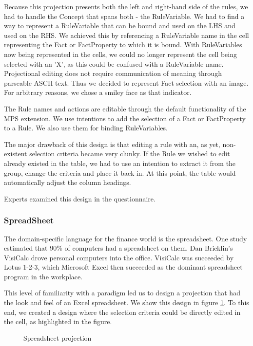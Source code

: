 Because this projection presents both the left and right-hand side of the rules, we had to handle the Concept that spans both - the RuleVariable.
We had to find a way to represent a RuleVariable that can be bound and used on the LHS and used on the RHS.
We achieved this by referencing a RuleVariable name in the cell representing the Fact or FactProperty to which it is bound.
With RuleVariables now being represented in the cells, we could no longer represent the cell being selected with an 'X', as this could be confused with a RuleVariable name.
Projectional editing does not require communication of meaning through parseable ASCII text.
Thus we decided to represent Fact selection with an image.
For arbitrary reasons, we chose a smiley face as that indicator.

The Rule names and actions are editable through the default functionality of the MPS extension.
We use intentions to add the selection of a Fact or FactProperty to a Rule.
We also use them for binding RuleVariables.

The major drawback of this design is that editing a rule with an, as yet, non-existent selection criteria became very clunky.
If the Rule we wished to edit already existed in the table, we had to use an intention to extract it from the group, change the criteria and place it back in.
At this point, the table would automatically adjust the column headings.

Experts examined this design in the questionnaire.

\subsubsection{SpreadSheet}

The domain-specific language for the finance world is the spreadsheet.
One study estimated that 90\% of computers had a spreadsheet on them\cite{bradley2009using}.
Dan Bricklin's VisiCalc drove personal computers into the office.
VisiCalc was succeeded by Lotus 1-2-3, which Microsoft Excel then succeeded as the dominant spreadsheet program in the workplace.

This level of familiarity with a paradigm led us to design a projection that had the look and feel of an Excel spreadsheet.
We show this design in figure \ref{fig:SpreadsheetProjection}.
To this end, we created a design where the selection criteria could be directly edited in the cell, as highlighted in the figure.

\begin{figure}[h]
    \centering
    \caption{Spreadsheet projection}
    \label{fig:SpreadsheetProjection}
\end{figure}

